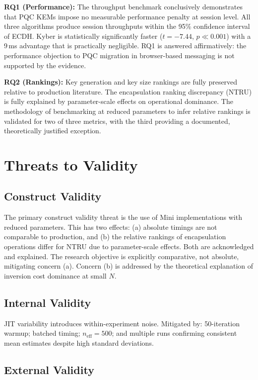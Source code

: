 \documentclass[12pt,a4paper]{report}
\begin{document}
\textbf{RQ1 (Performance):} The throughput benchmark conclusively demonstrates that
PQC KEMs impose no measurable performance penalty at session level. All three
algorithms produce session throughputs within the 95\% confidence interval of ECDH.
Kyber is statistically significantly faster ($t = -7.44$, $p \ll 0.001$) with a 9\,ms
advantage that is practically negligible. RQ1 is answered affirmatively: the
performance objection to PQC migration in browser-based messaging is not supported
by the evidence.

\textbf{RQ2 (Rankings):} Key generation and key size rankings are fully preserved
relative to production literature. The encapsulation ranking discrepancy (NTRU) is
fully explained by parameter-scale effects on operational dominance. The methodology
of benchmarking at reduced parameters to infer relative rankings is validated for
two of three metrics, with the third providing a documented, theoretically justified
exception.

\section{Threats to Validity}

\subsection{Construct Validity}

The primary construct validity threat is the use of Mini implementations with reduced
parameters. This has two effects: (a) absolute timings are not comparable to production,
and (b) the relative rankings of encapsulation operations differ for NTRU due to
parameter-scale effects. Both are acknowledged and explained. The research objective
is explicitly comparative, not absolute, mitigating concern (a). Concern (b) is
addressed by the theoretical explanation of inversion cost dominance at small $N$.

\subsection{Internal Validity}

JIT variability introduces within-experiment noise. Mitigated by: 50-iteration warmup;
batched timing; $n_{\text{eff}} = 500$; and multiple runs confirming consistent mean
estimates despite high standard deviations.

\subsection{External Validity}
\end{document}

